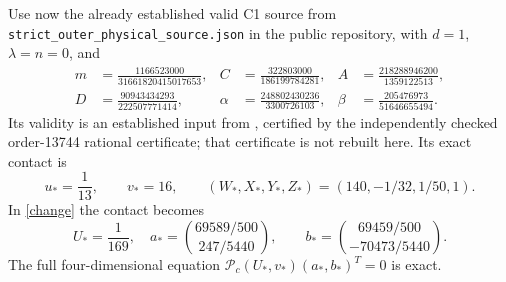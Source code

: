 \documentclass[11pt]{article}
\begin{document}
Use now the already established valid C1 source from
\texttt{strict\_outer\_physical\_source.json} in the public repository,
with $d=1$, $\lambda=n=0$, and
\begin{align*}
m&=\frac{1166523000}{31661820415017653},&
C&=\frac{322803000}{186199784281},&
A&=\frac{218288946200}{1359122513},\\
D&=\frac{90943434293}{222507771414},&
\alpha&=\frac{248802430236}{3300726103},&
\beta&=\frac{205476973}{51646655494}.
\end{align*}
Its validity is an established input from \cite{Project}, certified by the independently checked
order-13744 rational certificate; that certificate is not rebuilt here.
Its exact contact is
\[
u_*=\frac1{13},\qquad v_*=16,\qquad
(W_*,X_*,Y_*,Z_*)=(140,-1/32,1/50,1).
\]
In \eqref{change} the contact becomes
\begin{equation}
U_*=\frac1{169},\quad
a_* =\binom{69589/500}{247/5440},\qquad
b_* =\binom{69459/500}{-70473/5440}.\label{contact}
\end{equation}
The full four-dimensional equation
$\mathcal P_c(U_*,v_*)(a_*,b_*)^T=0$ is exact.
\end{document}

